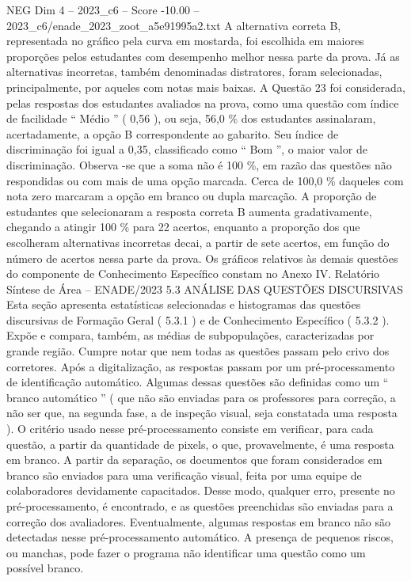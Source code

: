 \begin{textsample}{NEG Dim 4 – 2023\_c6 – Score -10.00 – 2023\_c6/enade\_2023\_zoot\_a5e91995a2.txt}
A alternativa correta B, representada no gráfico pela curva em mostarda, foi escolhida em maiores proporções pelos estudantes com desempenho melhor nessa parte da prova.
Já as alternativas incorretas, também denominadas distratores, foram selecionadas, principalmente, por aqueles com notas mais baixas.
A Questão 23 foi considerada, pelas respostas dos estudantes avaliados na prova, como uma questão com índice de facilidade “ Médio ” ( 0,56 ), ou seja, 56,0 \% dos estudantes assinalaram, acertadamente, a opção B correspondente ao gabarito.
Seu índice de discriminação foi igual a 0,35, classificado como “ Bom ”, o maior valor de discriminação.
Observa -se que a soma não é 100 \%, em razão das questões não respondidas ou com mais de uma opção marcada.
Cerca de 100,0 \% daqueles com nota zero marcaram a opção em branco ou dupla marcação.
A proporção de estudantes que selecionaram a resposta correta B aumenta gradativamente, chegando a atingir 100 \% para 22 acertos, enquanto a proporção dos que escolheram alternativas incorretas decai, a partir de sete acertos, em função do número de acertos nessa parte da prova.
Os gráficos relativos às demais questões do componente de Conhecimento Específico constam no Anexo IV.
Relatório Síntese de Área – ENADE/2023 5.3 ANÁLISE DAS QUESTÕES DISCURSIVAS Esta seção apresenta estatísticas selecionadas e histogramas das questões discursivas de Formação Geral ( 5.3.1 ) e de Conhecimento Específico ( 5.3.2 ).
Expõe e compara, também, as médias de subpopulações, caracterizadas por grande região.
Cumpre notar que nem todas as questões passam pelo crivo dos corretores.
Após a digitalização, as respostas passam por um pré-processamento de identificação automático.
Algumas dessas questões são definidas como um “ branco automático ” ( que não são enviadas para os professores para correção, a não ser que, na segunda fase, a de inspeção visual, seja constatada uma resposta ).
O critério usado nesse pré-processamento consiste em verificar, para cada questão, a partir da quantidade de pixels, o que, provavelmente, é uma resposta em branco.
A partir da separação, os documentos que foram considerados em branco são enviados para uma verificação visual, feita por uma equipe de colaboradores devidamente capacitados.
Desse modo, qualquer erro, presente no pré-processamento, é encontrado, e as questões preenchidas são enviadas para a correção dos avaliadores.
Eventualmente, algumas respostas em branco não são detectadas nesse pré-processamento automático.
A presença de pequenos riscos, ou manchas, pode fazer o programa não identificar uma questão como um possível branco.

\end{textsample}
